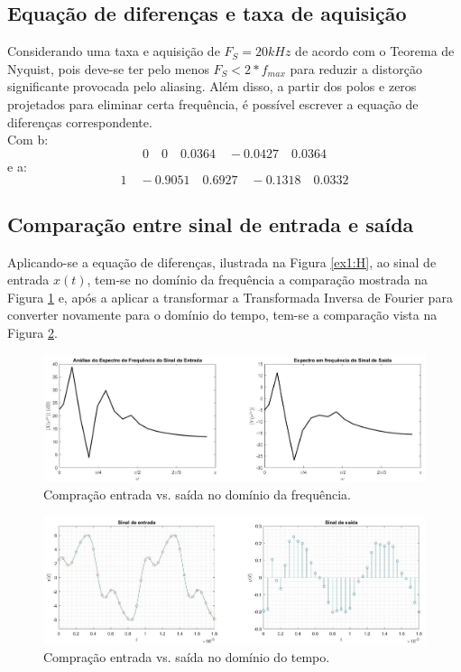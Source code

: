 \documentclass[a4paper,12pt,oneside,openany,table,xcdraw]{article}
\begin{document}
\subsection{Equação de diferenças e taxa de aquisição}
Considerando uma taxa e aquisição de $F_S=20kHz$ de acordo com o Teorema de Nyquist, pois deve-se ter pelo menos $F_S<2*f_{max}$ para reduzir a distorção significante provocada pelo aliasing. Além disso, a partir dos polos e zeros projetados para eliminar certa frequência, é possível escrever a equação de diferenças correspondente. \\
Com b:
$$0\quad   0\quad   0.0364\quad -0.0427\quad 0.0364$$
e a:
$$1\quad -0.9051\quad 0.6927\quad -0.1318\quad 0.0332$$

\vspace{0.3cm}
\subsection{Comparação entre sinal de entrada e saída}
Aplicando-se a equação de diferenças, ilustrada na Figura \ref{ex1:H}, ao sinal de entrada $x(t)$, tem-se no domínio da frequência a comparação mostrada na Figura \ref{ex1:comp:H} e, após a aplicar a transformar a Transformada Inversa de Fourier para converter novamente para o domínio do tempo, tem-se a comparação vista na Figura \ref{ex1:comp:t}.


\begin{figure}[H]
\centering
\includegraphics[width=15.5cm]{ex1-comp-H}
\caption{Compração entrada vs. saída no domínio da frequência.}
\label{ex1:comp:H}
\end{figure}
\vspace{0.1cm}

\begin{figure}[H]
\centering
\includegraphics[width=15.5cm]{ex1-comp-t}
\caption{Compração entrada vs. saída no domínio do tempo.}
\label{ex1:comp:t}
\end{figure}
\vspace{0.1cm}
\end{document}
